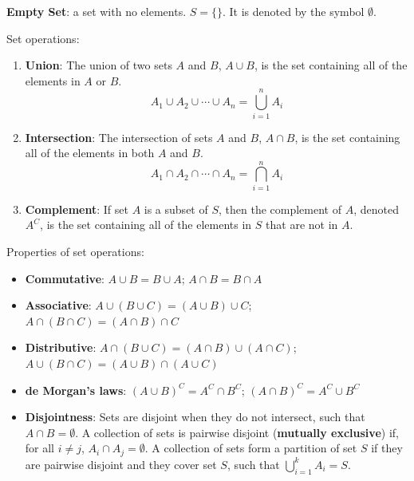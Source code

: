\documentclass[
  letterpaper,
]{book}
\providecommand{\tightlist}{%
  \setlength{\itemsep}{0pt}\setlength{\parskip}{0pt}}\usepackage{longtable,booktabs,array}
\theoremstyle{definition}
\theoremstyle{definition}
\theoremstyle{plain}
\theoremstyle{definition}
\theoremstyle{plain}
\theoremstyle{plain}
\theoremstyle{remark}
\begin{document}
\textbf{Empty Set}: a set with no elements. \(S = \{\}\). It is denoted
by the symbol \(\emptyset\).

Set operations:

\begin{enumerate}
\def\labelenumi{\arabic{enumi}.}
\tightlist
\item
  \textbf{Union}: The union of two sets \(A\) and \(B\), \(A \cup B\),
  is the set containing all of the elements in \(A\) or \(B\).
  \[A_1 \cup A_2  \cup \cdots \cup A_n = \bigcup_{i=1}^n A_i\]
\item
  \textbf{Intersection}: The intersection of sets \(A\) and \(B\),
  \(A \cap B\), is the set containing all of the elements in both \(A\)
  and \(B\).
  \[A_1 \cap A_2  \cap \cdots \cap A_n = \bigcap_{i=1}^n A_i\]
\item
  \textbf{Complement}: If set \(A\) is a subset of \(S\), then the
  complement of \(A\), denoted \(A^C\), is the set containing all of the
  elements in \(S\) that are not in \(A\).
\end{enumerate}

Properties of set operations:

\begin{itemize}
\tightlist
\item
  \textbf{Commutative}: \(A \cup B = B \cup A\); \(A \cap B = B \cap A\)
\item
  \textbf{Associative}: \(A \cup (B \cup C) = (A \cup B) \cup C\);
  \(A \cap (B \cap C) = (A \cap B) \cap C\)
\item
  \textbf{Distributive}:
  \(A \cap (B \cup C) = (A \cap B) \cup (A \cap C)\);
  \(A \cup (B \cap C) = (A \cup B) \cap (A \cup C)\)
\item
  \textbf{de Morgan's laws}: \((A \cup B)^C = A^C \cap B^C\);
  \((A \cap B)^C = A^C \cup B^C\)
\item
  \textbf{Disjointness}: Sets are disjoint when they do not intersect,
  such that \(A \cap B = \emptyset\). A collection of sets is pairwise
  disjoint (\textbf{mutually exclusive}) if, for all \(i \neq j\),
  \(A_i \cap A_j = \emptyset\). A collection of sets form a partition of
  set \(S\) if they are pairwise disjoint and they cover set \(S\), such
  that \(\bigcup_{i = 1}^k A_i = S\).
\end{itemize}
\end{document}
